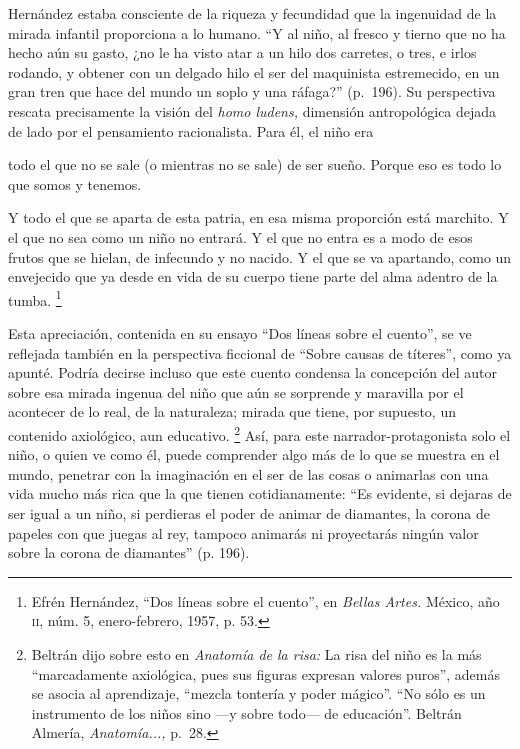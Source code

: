 \documentclass[14pt,twoside,final]{extbook} %
\let\oldfootnote\footnote
\renewcommand\footnote[1]{%
\oldfootnote{\hspace{1mm}#1}}
\begin{document}
Hernández estaba consciente de la riqueza y fecundidad que la ingenuidad de la mirada infantil proporciona a lo humano. ``Y al niño, al fresco y tierno que no ha hecho aún su gasto, ¿no le ha visto atar a un hilo dos carretes, o tres, e irlos rodando, y obtener con un delgado hilo el ser del maquinista estremecido, en un gran tren que hace del mundo un soplo y una ráfaga?'' (p.~196). Su perspectiva rescata precisamente la visión del \emph{homo ludens,} dimensión antropológica dejada de lado por el pensamiento racionalista. Para él, el niño era
\begin{quoting}
todo el que no se sale (o mientras no se sale) de ser sueño. Porque eso es todo lo que somos y tenemos.

Y todo el que se aparta de esta patria, en esa misma proporción está marchito. Y el que no sea como un niño no entrará. Y el que no entra es a modo de esos frutos que se hielan, de infecundo y no nacido. Y el que se va apartando, como un envejecido que ya desde en vida de su cuerpo tiene parte del alma adentro de la tumba.\footnote{Efrén Hernández, ``Dos líneas sobre el cuento'', en \emph{Bellas Artes.} México, año \textsc{ii}, núm. 5, enero-febrero, 1957, p. 53.}
\end{quoting}
Esta apreciación, contenida en su ensayo ``Dos líneas sobre el cuento'', se ve reflejada también en la perspectiva ficcional de ``Sobre causas de títeres'', como ya apunté. Podría decirse incluso que este cuento condensa la concepción del autor sobre esa mirada ingenua del niño que aún se sorprende y maravilla por el acontecer de lo real, de la naturaleza; mirada que tiene, por supuesto, un contenido axiológico, aun educativo.\footnote{Beltrán dijo sobre esto en \emph{Anatomía de la risa:} La risa del niño es la más ``marcadamente axiológica, pues sus figuras expresan valores puros'', además se asocia al aprendizaje, ``mezcla tontería y poder mágico''. ``No sólo es un instrumento de los niños sino ---y sobre todo--- de educación''. Beltrán Almería, \emph{Anatomía...,} p.~28.} Así, para este narrador-protagonista solo el niño, o quien ve como él, puede comprender algo más de lo que se muestra en el mundo, penetrar con la imaginación en el ser de las cosas o animarlas con una vida mucho más rica que la que tienen cotidianamente: ``Es evidente, si dejaras de ser igual a un niño, si perdieras el poder de animar de diamantes, la corona de papeles con que juegas al rey, tampoco animarás ni proyectarás ningún valor sobre la corona de diamantes'' (p. 196).
\end{document}
